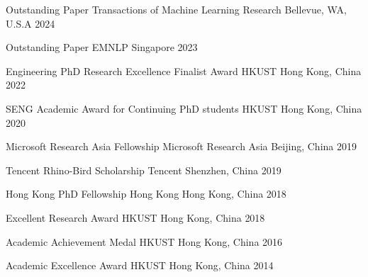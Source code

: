 



\begin{cvhonors}

  \cvhonor
    {Outstanding Paper} %
    {Transactions of Machine Learning Research} %
    {Bellevue, WA, U.S.A} %
    {2024} %

  \cvhonor
    {Outstanding Paper} %
    {EMNLP} %
    {Singapore} %
    {2023} %

  \cvhonor
    {Engineering PhD Research Excellence Finalist Award} %
    {HKUST} %
    {Hong Kong, China} %
    {2022} %

  \cvhonor
    {SENG Academic Award for Continuing PhD students} %
    {HKUST} %
    {Hong Kong, China} %
    {2020} %

  \cvhonor
    {Microsoft Research Asia Fellowship} %
    {Microsoft Research Asia} %
    {Beijing, China} %
    {2019} %

\cvhonor
    {Tencent Rhino-Bird Scholarship} %
    {Tencent} %
    {Shenzhen, China} %
    {2019} %

\cvhonor
    {Hong Kong PhD Fellowship} %
    {Hong Kong} %
    {Hong Kong, China} %
    {2018} %

\cvhonor
    {Excellent Research Award} %
    {HKUST} %
    {Hong Kong, China} %
    {2018} %

\cvhonor
    {Academic Achievement Medal} %
    {HKUST} %
    {Hong Kong, China} %
    {2016} %

\cvhonor
    {Academic Excellence Award} %
    {HKUST} %
    {Hong Kong, China} %
    {2014} %




\end{cvhonors}


